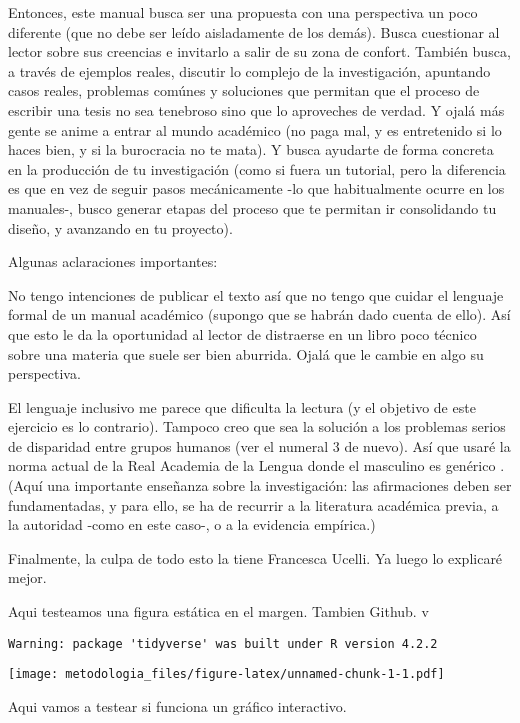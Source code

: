 \documentclass[
]{book}
\begin{document}
Entonces, este manual busca ser una propuesta con una perspectiva un poco diferente (que no debe ser leído aisladamente de los demás). Busca cuestionar al lector sobre sus creencias e invitarlo a salir de su zona de confort. También busca, a través de ejemplos reales, discutir lo complejo de la investigación, apuntando casos reales, problemas comúnes y soluciones que permitan que el proceso de escribir una tesis no sea tenebroso sino que lo aproveches de verdad. Y ojalá más gente se anime a entrar al mundo académico (no paga mal, y es entretenido si lo haces bien, y si la burocracia no te mata). Y busca ayudarte de forma concreta en la producción de tu investigación (como si fuera un tutorial, pero la diferencia es que en vez de seguir pasos mecánicamente -lo que habitualmente ocurre en los manuales-, busco generar etapas del proceso que te permitan ir consolidando tu diseño, y avanzando en tu proyecto).

Algunas aclaraciones importantes:

No tengo intenciones de publicar el texto así que no tengo que cuidar el lenguaje formal de un manual académico (supongo que se habrán dado cuenta de ello). Así que esto le da la oportunidad al lector de distraerse en un libro poco técnico sobre una materia que suele ser bien aburrida. Ojalá que le cambie en algo su perspectiva.

El lenguaje inclusivo me parece que dificulta la lectura (y el objetivo de este ejercicio es lo contrario). Tampoco creo que sea la solución a los problemas serios de disparidad entre grupos humanos (ver el numeral 3 de nuevo). Así que usaré la norma actual de la Real Academia de la Lengua donde el masculino es genérico \citep{rae}. (Aquí una importante enseñanza sobre la investigación: las afirmaciones deben ser fundamentadas, y para ello, se ha de recurrir a la literatura académica previa, a la autoridad -como en este caso-, o a la evidencia empírica.)

Finalmente, la culpa de todo esto la tiene Francesca Ucelli. Ya luego lo explicaré mejor.

Aqui testeamos una figura estática en el margen. Tambien Github. v

\begin{verbatim}
Warning: package 'tidyverse' was built under R version 4.2.2
\end{verbatim}

\texttt{[image: metodologia\_files/figure-latex/unnamed-chunk-1-1.pdf]}

Aqui vamos a testear si funciona un gráfico interactivo.
\end{document}
